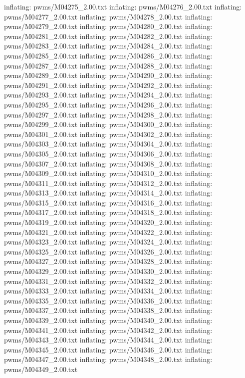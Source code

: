 \documentclass[letterpaper,10pt,english]{sphinxmanual}
\begin{document}
{\begin{sphinxVerbatim}[commandchars=\\\{\}]
  inflating: pwms/M04275\_2.00.txt
  inflating: pwms/M04276\_2.00.txt
  inflating: pwms/M04277\_2.00.txt
  inflating: pwms/M04278\_2.00.txt
  inflating: pwms/M04279\_2.00.txt
  inflating: pwms/M04280\_2.00.txt
  inflating: pwms/M04281\_2.00.txt
  inflating: pwms/M04282\_2.00.txt
  inflating: pwms/M04283\_2.00.txt
  inflating: pwms/M04284\_2.00.txt
  inflating: pwms/M04285\_2.00.txt
  inflating: pwms/M04286\_2.00.txt
  inflating: pwms/M04287\_2.00.txt
  inflating: pwms/M04288\_2.00.txt
  inflating: pwms/M04289\_2.00.txt
  inflating: pwms/M04290\_2.00.txt
  inflating: pwms/M04291\_2.00.txt
  inflating: pwms/M04292\_2.00.txt
  inflating: pwms/M04293\_2.00.txt
  inflating: pwms/M04294\_2.00.txt
  inflating: pwms/M04295\_2.00.txt
  inflating: pwms/M04296\_2.00.txt
  inflating: pwms/M04297\_2.00.txt
  inflating: pwms/M04298\_2.00.txt
  inflating: pwms/M04299\_2.00.txt
  inflating: pwms/M04300\_2.00.txt
  inflating: pwms/M04301\_2.00.txt
  inflating: pwms/M04302\_2.00.txt
  inflating: pwms/M04303\_2.00.txt
  inflating: pwms/M04304\_2.00.txt
  inflating: pwms/M04305\_2.00.txt
  inflating: pwms/M04306\_2.00.txt
  inflating: pwms/M04307\_2.00.txt
  inflating: pwms/M04308\_2.00.txt
  inflating: pwms/M04309\_2.00.txt
  inflating: pwms/M04310\_2.00.txt
  inflating: pwms/M04311\_2.00.txt
  inflating: pwms/M04312\_2.00.txt
  inflating: pwms/M04313\_2.00.txt
  inflating: pwms/M04314\_2.00.txt
  inflating: pwms/M04315\_2.00.txt
  inflating: pwms/M04316\_2.00.txt
  inflating: pwms/M04317\_2.00.txt
  inflating: pwms/M04318\_2.00.txt
  inflating: pwms/M04319\_2.00.txt
  inflating: pwms/M04320\_2.00.txt
  inflating: pwms/M04321\_2.00.txt
  inflating: pwms/M04322\_2.00.txt
  inflating: pwms/M04323\_2.00.txt
  inflating: pwms/M04324\_2.00.txt
  inflating: pwms/M04325\_2.00.txt
  inflating: pwms/M04326\_2.00.txt
  inflating: pwms/M04327\_2.00.txt
  inflating: pwms/M04328\_2.00.txt
  inflating: pwms/M04329\_2.00.txt
  inflating: pwms/M04330\_2.00.txt
  inflating: pwms/M04331\_2.00.txt
  inflating: pwms/M04332\_2.00.txt
  inflating: pwms/M04333\_2.00.txt
  inflating: pwms/M04334\_2.00.txt
  inflating: pwms/M04335\_2.00.txt
  inflating: pwms/M04336\_2.00.txt
  inflating: pwms/M04337\_2.00.txt
  inflating: pwms/M04338\_2.00.txt
  inflating: pwms/M04339\_2.00.txt
  inflating: pwms/M04340\_2.00.txt
  inflating: pwms/M04341\_2.00.txt
  inflating: pwms/M04342\_2.00.txt
  inflating: pwms/M04343\_2.00.txt
  inflating: pwms/M04344\_2.00.txt
  inflating: pwms/M04345\_2.00.txt
  inflating: pwms/M04346\_2.00.txt
  inflating: pwms/M04347\_2.00.txt
  inflating: pwms/M04348\_2.00.txt
  inflating: pwms/M04349\_2.00.txt

\end{sphinxVerbatim}}
\end{document}

